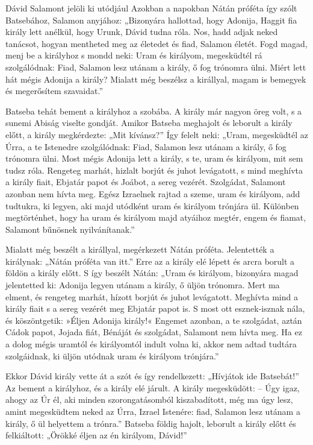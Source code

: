 \documentclass[twoside]{article}
\begin{document}
\begin{lectio}{Dávid Salamont jelöli ki utódjául}
\noindent Azokban a napokban Nátán próféta így szólt Batsebához, Salamon anyjához: „Bizonyára hallottad, hogy Adonija, Haggit fia király lett anélkül, hogy Urunk, Dávid tudna róla. Nos, hadd adjak neked tanácsot, hogyan mentheted meg az életedet és fiad, Salamon életét. Fogd magad, menj be a királyhoz s mondd neki: Uram és királyom, megesküdtél rá szolgálódnak: Fiad, Salamon lesz utánam a király, ő fog trónomra ülni. Miért lett hát mégis Adonija a király? Mialatt még beszélsz a királlyal, magam is bemegyek és megerősítem szavaidat.”

Batseba tehát bement a királyhoz a szobába. A király már nagyon öreg volt, s a sunemi Abiság viselte gondját. Amikor Batseba meghajolt és leborult a király előtt, a király megkérdezte: „Mit kívánsz?” Így felelt neki: „Uram, megesküdtél az Úrra, a te Istenedre szolgálódnak: Fiad, Salamon lesz utánam a király, ő fog trónomra ülni. Most mégis Adonija lett a király, s te, uram és királyom, mit sem tudsz róla. Rengeteg marhát, hizlalt borjút és juhot levágatott, s mind meghívta a király fiait, Ebjatár papot és Joábot, a sereg vezérét. Szolgádat, Salamont azonban nem hívta meg. Egész Izraelnek rajtad a szeme, uram és királyom, add tudtukra, ki legyen, aki majd utódként uram és királyom trónjára ül. Különben megtörténhet, hogy ha uram és királyom majd atyáihoz megtér, engem és fiamat, Salamont bűnösnek nyilvánítanak.”

Mialatt még beszélt a királlyal, megérkezett Nátán próféta. Jelentették a királynak: „Nátán próféta van itt.” Erre az a király elé lépett és arcra borult a földön a király előtt. S így beszélt Nátán: „Uram és királyom, bizonyára magad jelentetted ki: Adonija legyen utánam a király, ő üljön trónomra. Mert ma elment, és rengeteg marhát, hízott borjút és juhot levágatott. Meghívta mind a király fiait s a sereg vezérét meg Ebjatár papot is. S most ott esznek-isznak nála, és köszöntgetik: »Éljen Adonija király!« Engemet azonban, a te szolgádat, aztán Cádok papot, Jojada fiát, Bénáját és szolgádat, Salamont nem hívta meg. Ha ez a dolog mégis uramtól és királyomtól indult volna ki, akkor nem adtad tudtára szolgáidnak, ki üljön utódnak uram és királyom trónjára.”

Ekkor Dávid király vette át a szót és így rendelkezett: „Hívjátok ide Batsebát!” Az bement a királyhoz, és a király elé járult. A király megesküdött: – Úgy igaz, ahogy az Úr él, aki minden szorongatásomból kiszabadított, még ma úgy lesz, amint megesküdtem neked az Úrra, Izrael Istenére: fiad, Salamon lesz utánam a király, ő ül helyettem a trónra.” Batseba földig hajolt, leborult a király előtt és felkiáltott: „Örökké éljen az én királyom, Dávid!”


\end{lectio}
\end{document}
